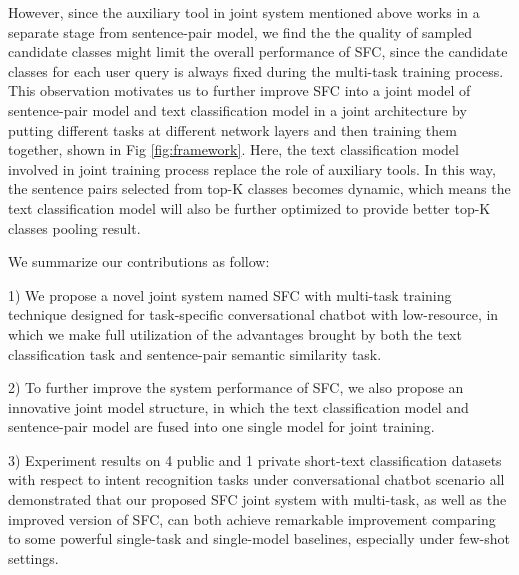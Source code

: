 \documentclass[letterpaper]{article} %
\begin{document}
  However,  since  the auxiliary tool in joint system mentioned above works in a
  separate  stage  from  sentence-pair model, we find the the quality of sampled
  candidate  classes  might  limit  the  overall  performance  of SFC, since the
  candidate  classes  for  each user query is always fixed during the multi-task
  training  process. This observation motivates us to further improve SFC into a
  joint  model  of  sentence-pair  model  and  text  classification  model  in a
  joint  architecture  by  putting  different  tasks at different network
  layers \cite{sogaard2016deep,   hashimoto2016joint}   and  then  training  them
  together,  shown  in  Fig  \ref{fig:framework}.  Here, the text classification
  model  involved in joint training process replace the role of auxiliary tools.
  In  this  way, the sentence pairs selected from top-K classes becomes dynamic,
  which  means  the  text classification model will also be further optimized to
  provide better top-K classes pooling result.

  We summarize our contributions as follow:

  1)  We  propose  a  novel  joint  system  named  SFC  with multi-task training
  technique designed for task-specific conversational chatbot with low-resource,
  in  which  we make full utilization of the advantages brought by both the text
  classification task and sentence-pair semantic similarity task.

  2)  To  further  improve  the  system  performance  of SFC, we also propose an
  innovative  joint  model structure, in which the text classification model and
  sentence-pair model are fused into one single model for joint training.

  3)  Experiment  results  on  4  public and 1 private short-text classification
  datasets with respect to intent recognition tasks under conversational chatbot
  scenario  all demonstrated that our proposed SFC joint system with multi-task,
  as  well  as  the  improved  version  of  SFC,  can  both  achieve  remarkable
  improvement comparing to some powerful single-task and single-model baselines,
  especially under few-shot settings.
\end{document}
